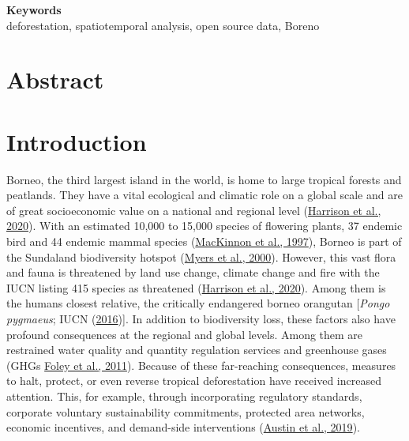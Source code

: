\documentclass[
  letterpaper,
  DIV=11,
  numbers=noendperiod]{scrreprt}
\begin{document}
\noindent\textbf{Keywords}\\
deforestation, spatiotemporal analysis, open source data, Boreno

\ifdefined\Shaded\renewenvironment{Shaded}{\begin{tcolorbox}[borderline west={3pt}{0pt}{shadecolor}, interior hidden, boxrule=0pt, enhanced, frame hidden, sharp corners, breakable]}{\end{tcolorbox}}\fi


\hypertarget{abstract}{%
\chapter*{Abstract}\label{abstract}}


\newpage
\tableofcontents


\hypertarget{sec-introduction}{%
\chapter{Introduction}\label{sec-introduction}}

Borneo, the third largest island in the world, is home to large tropical
forests and peatlands. They have a vital ecological and climatic role on
a global scale and are of great socioeconomic value on a national and
regional level
(\protect\hyperlink{ref-harrisonTropicalForestPeatland2020}{Harrison et
al., 2020}). With an estimated 10,000 to 15,000 species of flowering
plants, 37 endemic bird and 44 endemic mammal species
(\protect\hyperlink{ref-mackinnonEcologyKalimantan1997}{MacKinnon et
al., 1997}), Borneo is part of the Sundaland biodiversity hotspot
(\protect\hyperlink{ref-myersBiodiversityHotspotsConservation2000}{Myers
et al., 2000}). However, this vast flora and fauna is threatened by land
use change, climate change and fire with the IUCN listing 415 species as
threatened
(\protect\hyperlink{ref-harrisonTropicalForestPeatland2020}{Harrison et
al., 2020}). Among them is the humans closest relative, the critically
endangered borneo orangutan {[}\emph{Pongo pygmaeus}; IUCN
(\protect\hyperlink{ref-iucnPongoPygmaeusAncrenaz2016}{2016}){]}. In
addition to biodiversity loss, these factors also have profound
consequences at the regional and global levels. Among them are
restrained water quality and quantity regulation services and greenhouse
gases (GHGs
\protect\hyperlink{ref-foleySolutionsCultivatedPlanet2011}{Foley et al.,
2011}). Because of these far-reaching consequences, measures to halt,
protect, or even reverse tropical deforestation have received increased
attention. This, for example, through incorporating regulatory
standards, corporate voluntary sustainability commitments, protected
area networks, economic incentives, and demand-side interventions
(\protect\hyperlink{ref-austinWhatCausesDeforestation2019}{Austin et
al., 2019}).
\end{document}
